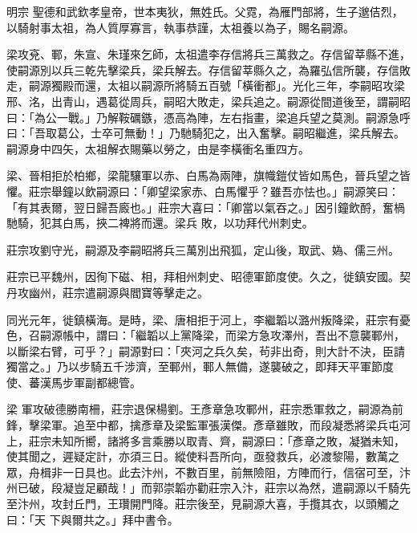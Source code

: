 
\begin{pinyinscope}

 明宗
 聖德和武欽孝皇帝，世本夷狄，無姓氏。父霓，為雁門部將，生子邈佶烈，以騎射事太祖，為人質厚寡言，執事恭謹，太祖養以為子，賜名嗣源。



 梁攻兗、鄆，朱宣、朱瑾來乞師，太祖遣李存信將兵三萬救之。存信留莘縣不進，使嗣源別以兵三乾先擊梁兵，梁兵解去。存信留莘縣久之，為羅弘信所襲，存信敗走，嗣源獨殿而還，太祖以嗣源所將騎五百號「橫衝都」。光化三年，李嗣昭攻梁
 邢、洺，出青山，遇葛從周兵，嗣昭大敗走，梁兵追之。嗣源從間道後至，謂嗣昭曰：「為公一戰。」乃解鞍礪鏃，憑高為陣，左右指畫，梁追兵望之莫測。嗣源急呼曰：「吾取葛公，士卒可無動！」乃馳騎犯之，出入奮擊。嗣昭繼進，梁兵解去。嗣源身中四矢，太祖解衣賜藥以勞之，由是李橫衝名重四方。



 梁、晉相拒於柏鄉，梁龍驤軍以赤、白馬為兩陣，旗幟鎧仗皆如馬色，晉兵望之皆懼。莊宗舉鐘以飲嗣源曰：「卿望梁家赤、白馬懼乎？雖吾亦怯也。」嗣源笑曰：「有其表爾，翌日歸吾廄也。」莊宗大喜曰：「卿當以氣吞之。」因引鐘飲酹，奮楇馳騎，犯其白馬，挾二裨將而還。梁兵
 敗，以功拜代州刺史。



 莊宗攻劉守光，嗣源及李嗣昭將兵三萬別出飛狐，定山後，取武、媯、儒三州。



 莊宗已平魏州，因徇下磁、相，拜相州刺史、昭德軍節度使。久之，徙鎮安國。契丹攻幽州，莊宗遣嗣源與閻寶等擊走之。



 同光元年，徙鎮橫海。是時，梁、唐相拒于河上，李繼韜以潞州叛降梁，莊宗有憂色，召嗣源帳中，謂曰：「繼韜以上黨降梁，而梁方急攻澤州，吾出不意襲鄆州，以斷梁右臂，可乎？」嗣源對曰：「夾河之兵久矣，茍非出奇，則大計不決，臣請獨當之。」乃以步騎五千涉濟，至鄆州，鄆人無備，遂襲破之，即拜天平軍節度使、蕃漢馬步軍副都總管。



 梁
 軍攻破德勝南柵，莊宗退保楊劉。王彥章急攻鄆州，莊宗悉軍救之，嗣源為前鋒，擊梁軍。追至中都，擒彥章及梁監軍張漢傑。彥章雖敗，而段凝悉將梁兵屯河上，莊宗未知所嚮，諸將多言乘勝以取青、齊，嗣源曰：「彥章之敗，凝猶未知，使其聞之，遲疑定計，亦須三日。縱使料吾所向，亟發救兵，必渡黎陽，數萬之眾，舟楫非一日具也。此去汴州，不數百里，前無險阻，方陣而行，信宿可至，汴州已破，段凝豈足顧哉！」而郭崇韜亦勸莊宗入汴，莊宗以為然，遣嗣源以千騎先至汴州，攻封丘門，王瓚開門降。莊宗後至，見嗣源大喜，手攬其衣，以頭觸之曰：「天
 下與爾共之。」拜中書令。




\end{pinyinscope}
